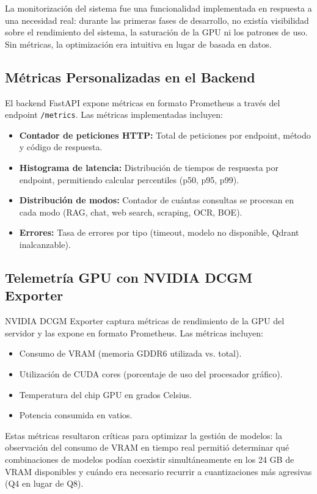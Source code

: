 La monitorización del sistema fue una funcionalidad implementada en respuesta a una necesidad real: durante las primeras fases de desarrollo, no existía visibilidad sobre el rendimiento del sistema, la saturación de la GPU ni los patrones de uso. Sin métricas, la optimización era intuitiva en lugar de basada en datos.

\subsection{Métricas Personalizadas en el Backend}

El backend FastAPI expone métricas en formato Prometheus a través del endpoint \texttt{/metrics}. Las métricas implementadas incluyen:

\begin{itemize}
    \item \textbf{Contador de peticiones HTTP:} Total de peticiones por endpoint, método y código de respuesta.
    \item \textbf{Histograma de latencia:} Distribución de tiempos de respuesta por endpoint, permitiendo calcular percentiles (p50, p95, p99).
    \item \textbf{Distribución de modos:} Contador de cuántas consultas se procesan en cada modo (RAG, chat, web search, scraping, OCR, BOE).
    \item \textbf{Errores:} Tasa de errores por tipo (timeout, modelo no disponible, Qdrant inalcanzable).
\end{itemize}

\subsection{Telemetría GPU con NVIDIA DCGM Exporter}

NVIDIA DCGM Exporter captura métricas de rendimiento de la GPU del servidor y las expone en formato Prometheus. Las métricas incluyen:

\begin{itemize}
    \item Consumo de VRAM (memoria GDDR6 utilizada vs. total).
    \item Utilización de CUDA cores (porcentaje de uso del procesador gráfico).
    \item Temperatura del chip GPU en grados Celsius.
    \item Potencia consumida en vatios.
\end{itemize}

Estas métricas resultaron críticas para optimizar la gestión de modelos: la observación del consumo de VRAM en tiempo real permitió determinar qué combinaciones de modelos podían coexistir simultáneamente en los 24 GB de VRAM disponibles y cuándo era necesario recurrir a cuantizaciones más agresivas (Q4 en lugar de Q8).

